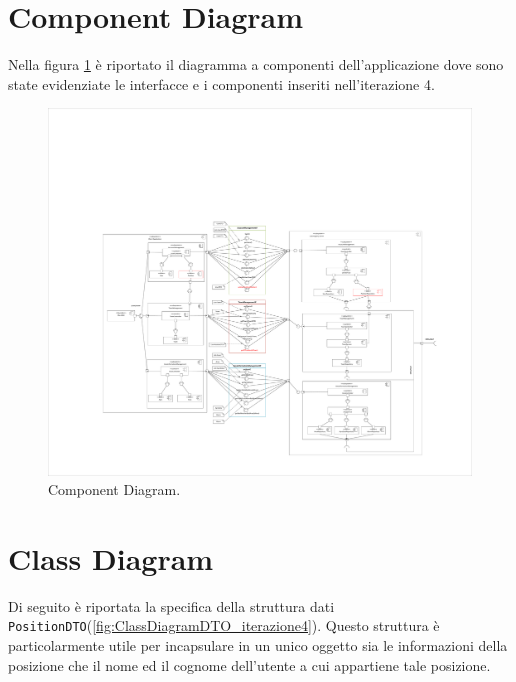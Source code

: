 \section{Component Diagram}
Nella figura \ref{fig:ComponentDiagram_iterazione3} è riportato il diagramma a componenti dell'applicazione dove sono state evidenziate le interfacce e i componenti inseriti nell'iterazione 4. 
\begin{figure}[h!]
	\centering
	\includegraphics[width=1\linewidth]{./Iterazione 4/OtherFiles/UML - Component view V2}
	\caption{Component Diagram.}
	\label{fig:ComponentDiagram_iterazione3}
\end{figure}

\clearpage
\section{Class Diagram}
Di seguito è riportata la specifica della struttura dati \texttt{PositionDTO}(\Fig\ref{fig:ClassDiagramDTO_iterazione4}). Questo struttura è particolarmente utile per incapsulare in un unico oggetto sia le informazioni della posizione che il nome ed il cognome dell'utente a cui appartiene tale posizione. 

